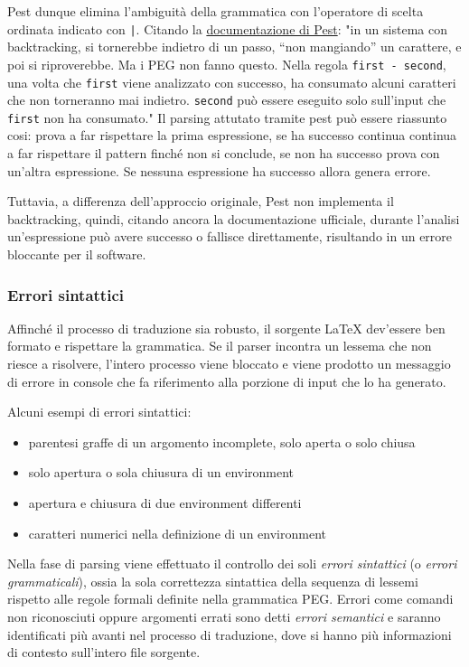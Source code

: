 \documentclass{article}
\begin{document}
    Pest dunque elimina l'ambiguità della grammatica con l'operatore di scelta ordinata indicato con \texttt{|}.
    Citando la \href{https://pest.rs/book/grammars/peg.html#non-backtracking}{documentazione di Pest}: "in un sistema con backtracking, si tornerebbe indietro di un passo, “non mangiando” un carattere, e poi si riproverebbe. Ma i PEG non fanno questo. Nella regola \texttt{first - second}, una volta che \texttt{first} viene analizzato con successo, ha consumato alcuni caratteri che non torneranno mai indietro. \texttt{second} può essere eseguito solo sull'input che \texttt{first} non ha consumato."
    Il parsing attutato tramite pest può essere riassunto cosi: prova a far rispettare la prima espressione, se ha successo continua continua a far rispettare il pattern finché non si conclude, se non ha successo prova con un'altra espressione. Se nessuna espressione ha successo allora genera errore.

    Tuttavia, a differenza dell'approccio originale, Pest non implementa il backtracking, quindi, citando ancora la documentazione ufficiale, durante l'analisi un'espressione può avere successo o fallisce direttamente, risultando in un errore bloccante per il software.

    \subsubsection{Errori sintattici}

    Affinché il processo di traduzione sia robusto, il sorgente LaTeX dev'essere ben formato e rispettare la grammatica.
    Se il parser incontra un lessema che non riesce a risolvere, l'intero processo viene bloccato e viene prodotto un messaggio di errore in console che fa riferimento alla porzione di input che lo ha generato.

    Alcuni esempi di errori sintattici:
    \begin{itemize}
        \item parentesi graffe di un argomento incomplete, solo aperta o solo chiusa
        \item solo apertura o sola chiusura di un environment
        \item apertura e chiusura di due environment differenti
        \item caratteri numerici nella definizione di un environment
    \end{itemize}

    Nella fase di parsing viene effettuato il controllo dei soli \textit{errori sintattici} (o \textit{errori grammaticali}), ossia la sola correttezza sintattica della sequenza di lessemi rispetto alle regole formali definite nella grammatica PEG.
    Errori come comandi non riconosciuti oppure argomenti errati sono detti \textit{errori semantici} e saranno identificati più avanti nel processo di traduzione, dove si hanno più informazioni di contesto sull'intero file sorgente.
\end{document}
